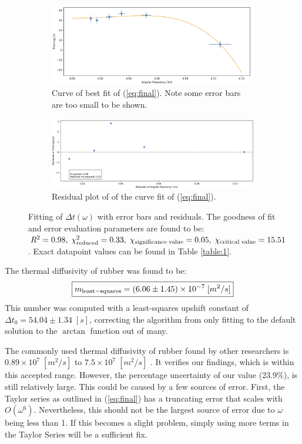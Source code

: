 \documentclass[12pt]{article}
\begin{document}
\begin{figure}[h!]
    \centering
    \begin{subfigure}{0.82\textwidth}
        \includegraphics[width=\textwidth]{figure/data.png}
        \caption{Curve of best fit of (\ref{eq:final}). Note some error bars are too small to be shown.}
    \end{subfigure}
    \begin{subfigure}{0.9\textwidth}
        \includegraphics[width=\textwidth]{figure/residuals.png}
        \caption{Residual plot of of the curve fit of (\ref{eq:final}).}
    \end{subfigure}
    \caption{Fitting of $\Delta t(\omega)$ with error bars and residuals. The goodness of fit and error evaluation parameters are found to be: $R^2=0.98,\;\chi_{\rm reduced}^2=0.33,\;\chi_{\rm significance\;value}=0.05,\;\chi_{\rm critical\;value}=15.51$. Exact datapoint values can be found in Table \ref{table:1}.}
    \label{fig:fit}
\end{figure}

The thermal diffusivity of rubber was found to be: 
\begin{equation}
    \boxed{m_{\rm least-squares} = (6.06 \pm 1.45) \times 10^{-7}\; [m^{2}/s]}
    \label{eq:result}
\end{equation}
This number was computed with a least-squares upshift constant of $\Delta t_0=54.04\pm1.34\;[s]$, correcting the algorithm from only fitting to the default solution to the $\arctan$ function out of many.

The commonly used thermal diffusivity of rubber found by other researchers is $0.89\times 10^7\; [m^{2}/s]$ to $7.5\times 10^7\; [m^{2}/s]$ \autocite{article}. It verifies our findings, which is within this accepted range. However, the percentage uncertainty of our value (23.9\%), is still relatively large. This could be caused by a few sources of error. First, the Taylor series as outlined in (\ref{eq:final}) has a truncating error that scales with $O(\omega^6)$. Nevertheless, this should not be the largest source of error due to $\omega$ being less than 1. If this becomes a slight problem, simply using more terms in the Taylor Series will be a sufficient fix.
\end{document}
